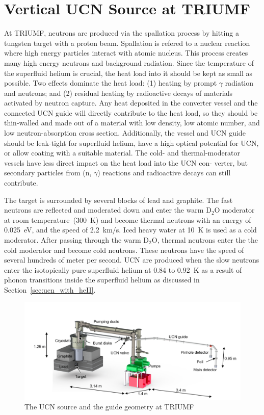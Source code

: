 \section{Vertical UCN Source at TRIUMF\label{sec:vertical_source}}
At TRIUMF, neutrons are produced via the spallation process by hitting
a tungsten target with a proton beam. Spallation is refered to a
nuclear reaction where high energy particles interact with atomic
nucleus. This process creates many high energy neutrons and background
radiation.  Since the temperature of the superfluid helium is crucial,
the heat load into it should be kept as small as possible. Two effects
dominate the heat load: (1) heating by prompt $\gamma$ radiation and
neutrons; and (2) residual heating by radioactive decays of materials
activated by neutron capture.  Any heat deposited in the converter
vessel and the connected UCN guide will directly contribute to the
heat load, so they should be thin-walled and made out of a material
with low density, low atomic number, and low neutron-absorption cross
section. Additionally, the vessel and UCN guide should be leak-tight
for superfluid helium, have a high optical potential for UCN, or allow
coating with a suitable material. The cold- and thermal-moderator
vessels have less direct impact on the heat load into the UCN con-
verter, but secondary particles from (n, $\gamma$) reactions and
radioactive decays can still contribute.




The target is surrounded by several blocks of lead and
graphite. The fast neutrons are reflected and moderated down and enter
the warm D$_2$O moderator at room temperature~(300~K) and become
thermal neutrons with an energy of 0.025~eV, and the speed of 2.2~km/s.
Iced heavy water at 10~K is used as a cold moderator. After passing
through the warm D$_2$O, thermal neutrons enter the the cold moderator
and become cold neutrons. These neutrons have the speed of several
hundreds of meter per second.  UCN are produced when the slow neutrons
enter the isotopically pure superfluid helium at 0.84 to 0.92~K as a
result of phonon transitions inside the superfluid helium as discussed
in Section~\ref{sec:ucn_with_heII}.


\begin{figure}[h!]
  \centering
  \includegraphics[width=1.1\textwidth]{Source_all.png}
  \caption{The UCN source and the guide geometry at TRIUMF }
  \label{fig:Source_all}
\end{figure}




